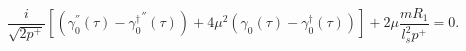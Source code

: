 \begin{equation}    \label{eq:gamma0}
\frac{i}{\sqrt{2 p^+}} \left[
(\gamma_0^{''}(\tau) - {\gamma_{0}^\dagger}^{''}(\tau)) 
   + 4 \mu^2 (\gamma_0(\tau) - {\gamma_{0}^\dagger}(\tau)) \right]
   + 2 \mu \frac{m R_1}{l_s^2 p^+}  = 0. 
\end{equation}

